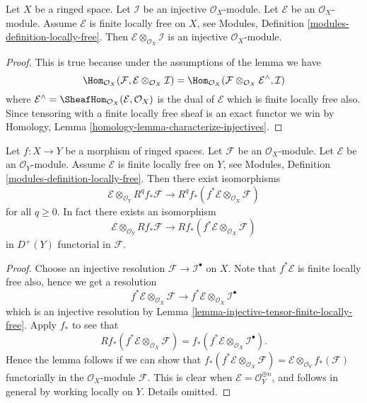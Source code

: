 \begin{lemma}
\label{lemma-injective-tensor-finite-locally-free}
Let $X$ be a ringed space.
Let $\mathcal{I}$ be an injective $\mathcal{O}_X$-module.
Let $\mathcal{E}$ be an $\mathcal{O}_X$-module.
Assume $\mathcal{E}$ is finite locally free on $X$, see
Modules, Definition \ref{modules-definition-locally-free}.
Then $\mathcal{E} \otimes_{\mathcal{O}_X} \mathcal{I}$ is
an injective $\mathcal{O}_X$-module.
\end{lemma}

\begin{proof}
This is true because under the assumptions of the lemma we have
$$
\Hom_{\mathcal{O}_X}(\mathcal{F},
\mathcal{E} \otimes_{\mathcal{O}_X} \mathcal{I})
=
\Hom_{\mathcal{O}_X}(
\mathcal{F} \otimes_{\mathcal{O}_X} \mathcal{E}^\wedge, \mathcal{I})
$$
where
$\mathcal{E}^\wedge = \SheafHom_{\mathcal{O}_X}(\mathcal{E}, \mathcal{O}_X)$
is the dual of $\mathcal{E}$ which is finite locally free also. Since tensoring
with a finite locally free sheaf is an exact functor we win by
Homology, Lemma \ref{homology-lemma-characterize-injectives}.
\end{proof}

\begin{lemma}
\label{lemma-projection-formula}
Let $f : X \to Y$ be a morphism of ringed spaces.
Let $\mathcal{F}$ be an $\mathcal{O}_X$-module.
Let $\mathcal{E}$ be an $\mathcal{O}_Y$-module.
Assume $\mathcal{E}$ is finite locally free on $Y$, see
Modules, Definition \ref{modules-definition-locally-free}.
Then there exist isomorphisms
$$
\mathcal{E} \otimes_{\mathcal{O}_Y} R^qf_*\mathcal{F}
\longrightarrow
R^qf_*(f^*\mathcal{E} \otimes_{\mathcal{O}_X} \mathcal{F})
$$
for all $q \geq 0$. In fact there exists an isomorphism
$$
\mathcal{E} \otimes_{\mathcal{O}_Y} Rf_*\mathcal{F}
\longrightarrow
Rf_*(f^*\mathcal{E} \otimes_{\mathcal{O}_X} \mathcal{F})
$$
in $D^{+}(Y)$ functorial in $\mathcal{F}$.
\end{lemma}

\begin{proof}
Choose an injective resolution $\mathcal{F} \to \mathcal{I}^\bullet$
on $X$. Note that $f^*\mathcal{E}$ is finite locally free also, hence
we get a resolution
$$
f^*\mathcal{E} \otimes_{\mathcal{O}_X} \mathcal{F}
\longrightarrow
f^*\mathcal{E} \otimes_{\mathcal{O}_X} \mathcal{I}^\bullet
$$
which is an injective resolution by
Lemma \ref{lemma-injective-tensor-finite-locally-free}.
Apply $f_*$ to see that
$$
Rf_*(f^*\mathcal{E} \otimes_{\mathcal{O}_X} \mathcal{F})
=
f_*(f^*\mathcal{E} \otimes_{\mathcal{O}_X} \mathcal{I}^\bullet).
$$
Hence the lemma follows if we can show that
$f_*(f^*\mathcal{E} \otimes_{\mathcal{O}_X} \mathcal{F}) =
\mathcal{E} \otimes_{\mathcal{O}_Y} f_*(\mathcal{F})$ functorially
in the $\mathcal{O}_X$-module $\mathcal{F}$. This is clear when
$\mathcal{E} = \mathcal{O}_Y^{\oplus n}$, and follows in general
by working locally on $Y$. Details omitted.
\end{proof}

